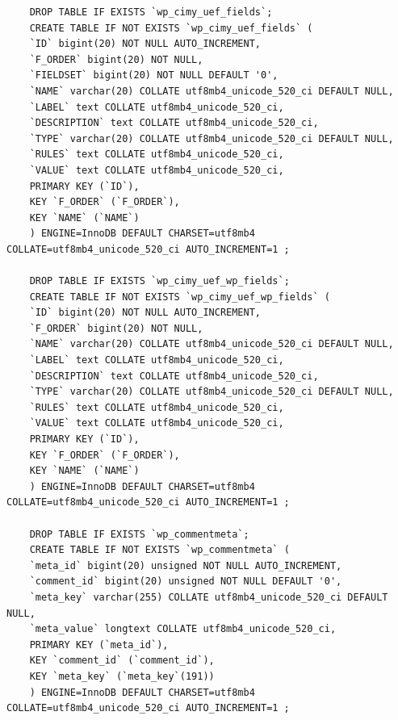 \documentclass[10pt,a4paper]{article}
\begin{document}
\begin{lstlisting}
	DROP TABLE IF EXISTS `wp_cimy_uef_fields`;
	CREATE TABLE IF NOT EXISTS `wp_cimy_uef_fields` (
	`ID` bigint(20) NOT NULL AUTO_INCREMENT,
	`F_ORDER` bigint(20) NOT NULL,
	`FIELDSET` bigint(20) NOT NULL DEFAULT '0',
	`NAME` varchar(20) COLLATE utf8mb4_unicode_520_ci DEFAULT NULL,
	`LABEL` text COLLATE utf8mb4_unicode_520_ci,
	`DESCRIPTION` text COLLATE utf8mb4_unicode_520_ci,
	`TYPE` varchar(20) COLLATE utf8mb4_unicode_520_ci DEFAULT NULL,
	`RULES` text COLLATE utf8mb4_unicode_520_ci,
	`VALUE` text COLLATE utf8mb4_unicode_520_ci,
	PRIMARY KEY (`ID`),
	KEY `F_ORDER` (`F_ORDER`),
	KEY `NAME` (`NAME`)
	) ENGINE=InnoDB DEFAULT CHARSET=utf8mb4 COLLATE=utf8mb4_unicode_520_ci AUTO_INCREMENT=1 ;
	
	DROP TABLE IF EXISTS `wp_cimy_uef_wp_fields`;
	CREATE TABLE IF NOT EXISTS `wp_cimy_uef_wp_fields` (
	`ID` bigint(20) NOT NULL AUTO_INCREMENT,
	`F_ORDER` bigint(20) NOT NULL,
	`NAME` varchar(20) COLLATE utf8mb4_unicode_520_ci DEFAULT NULL,
	`LABEL` text COLLATE utf8mb4_unicode_520_ci,
	`DESCRIPTION` text COLLATE utf8mb4_unicode_520_ci,
	`TYPE` varchar(20) COLLATE utf8mb4_unicode_520_ci DEFAULT NULL,
	`RULES` text COLLATE utf8mb4_unicode_520_ci,
	`VALUE` text COLLATE utf8mb4_unicode_520_ci,
	PRIMARY KEY (`ID`),
	KEY `F_ORDER` (`F_ORDER`),
	KEY `NAME` (`NAME`)
	) ENGINE=InnoDB DEFAULT CHARSET=utf8mb4 COLLATE=utf8mb4_unicode_520_ci AUTO_INCREMENT=1 ;
	
	DROP TABLE IF EXISTS `wp_commentmeta`;
	CREATE TABLE IF NOT EXISTS `wp_commentmeta` (
	`meta_id` bigint(20) unsigned NOT NULL AUTO_INCREMENT,
	`comment_id` bigint(20) unsigned NOT NULL DEFAULT '0',
	`meta_key` varchar(255) COLLATE utf8mb4_unicode_520_ci DEFAULT NULL,
	`meta_value` longtext COLLATE utf8mb4_unicode_520_ci,
	PRIMARY KEY (`meta_id`),
	KEY `comment_id` (`comment_id`),
	KEY `meta_key` (`meta_key`(191))
	) ENGINE=InnoDB DEFAULT CHARSET=utf8mb4 COLLATE=utf8mb4_unicode_520_ci AUTO_INCREMENT=1 ;
	

\end{lstlisting}
\end{document}
